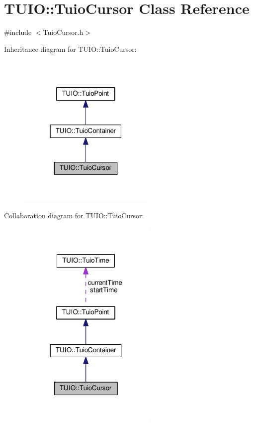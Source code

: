 \hypertarget{class_t_u_i_o_1_1_tuio_cursor}{}\section{T\+U\+IO\+:\+:Tuio\+Cursor Class Reference}
\label{class_t_u_i_o_1_1_tuio_cursor}


{\ttfamily \#include $<$Tuio\+Cursor.\+h$>$}



Inheritance diagram for T\+U\+IO\+:\+:Tuio\+Cursor\+:\nopagebreak
\begin{figure}[H]
\begin{center}
\leavevmode
\includegraphics[width=187pt]{class_t_u_i_o_1_1_tuio_cursor__inherit__graph}
\end{center}
\end{figure}


Collaboration diagram for T\+U\+IO\+:\+:Tuio\+Cursor\+:\nopagebreak
\begin{figure}[H]
\begin{center}
\leavevmode
\includegraphics[width=189pt]{class_t_u_i_o_1_1_tuio_cursor__coll__graph}
\end{center}
\end{figure}
